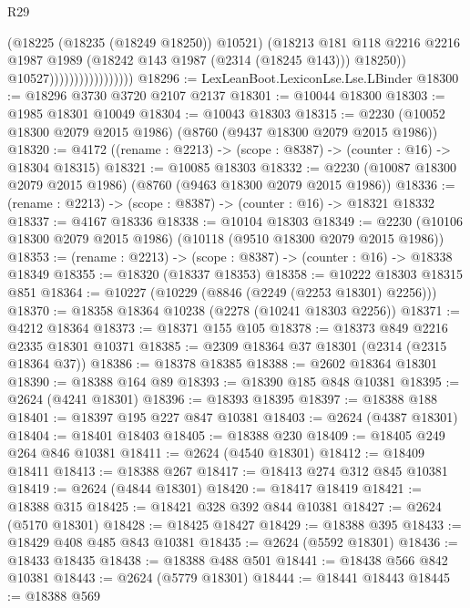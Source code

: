 \begin{lexlean}{R29}
\begin{coremodule}
                                        (@18225 (@18235 (@18249 @18250)) @10521)
                                        (@18213
                                          @181
                                          @118
                                          @2216
                                          @2216
                                          @1987
                                          @1989
                                          (@18242 @143 @1987 (@2314 (@18245 @143)))
                                          @18250))
                                      @10527)))))))))))))))))
@18296 := LexLeanBoot.LexiconLse.Lse.LBinder
@18300 := @18296 @3730 @3720 @2107 @2137
@18301 := @10044 @18300
@18303 := @1985 @18301 @10049
@18304 := @10043 @18303
@18315 := @2230 (@10052 @18300 @2079 @2015 @1986) (@8760 (@9437 @18300 @2079 @2015 @1986))
@18320 := @4172 ((rename : @2213) -> (scope : @8387) -> (counter : @16) -> @18304 @18315)
@18321 := @10085 @18303
@18332 := @2230 (@10087 @18300 @2079 @2015 @1986) (@8760 (@9463 @18300 @2079 @2015 @1986))
@18336 := (rename : @2213) -> (scope : @8387) -> (counter : @16) -> @18321 @18332
@18337 := @4167 @18336
@18338 := @10104 @18303
@18349 := @2230 (@10106 @18300 @2079 @2015 @1986) (@10118 (@9510 @18300 @2079 @2015 @1986))
@18353 := (rename : @2213) -> (scope : @8387) -> (counter : @16) -> @18338 @18349
@18355 := @18320 (@18337 @18353)
@18358 := @10222 @18303 @18315 @851
@18364 := @10227 (@10229 (@8846 (@2249 (@2253 @18301) @2256)))
@18370 := @18358 @18364 @10238 (@2278 (@10241 @18303 @2256))
@18371 := @4212 @18364
@18373 := @18371 @155 @105
@18378 := @18373 @849 @2216 @2335 @18301 @10371
@18385 := @2309 @18364 @37 @18301 (@2314 (@2315 @18364 @37))
@18386 := @18378 @18385
@18388 := @2602 @18364 @18301
@18390 := @18388 @164 @89
@18393 := @18390 @185 @848 @10381
@18395 := @2624 (@4241 @18301)
@18396 := @18393 @18395
@18397 := @18388 @188
@18401 := @18397 @195 @227 @847 @10381
@18403 := @2624 (@4387 @18301)
@18404 := @18401 @18403
@18405 := @18388 @230
@18409 := @18405 @249 @264 @846 @10381
@18411 := @2624 (@4540 @18301)
@18412 := @18409 @18411
@18413 := @18388 @267
@18417 := @18413 @274 @312 @845 @10381
@18419 := @2624 (@4844 @18301)
@18420 := @18417 @18419
@18421 := @18388 @315
@18425 := @18421 @328 @392 @844 @10381
@18427 := @2624 (@5170 @18301)
@18428 := @18425 @18427
@18429 := @18388 @395
@18433 := @18429 @408 @485 @843 @10381
@18435 := @2624 (@5592 @18301)
@18436 := @18433 @18435
@18438 := @18388 @488 @501
@18441 := @18438 @566 @842 @10381
@18443 := @2624 (@5779 @18301)
@18444 := @18441 @18443
@18445 := @18388 @569

\end{coremodule}
\end{lexlean}
